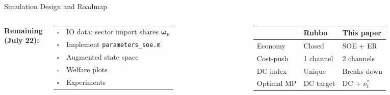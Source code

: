 \documentclass[aspectratio=169, 10pt]{beamer}
\newcommand{\bom}{\bm{\omega}_F}
\begin{document}
\begin{frame}{Simulation Design and Roadmap}
\begin{columns}[t]
\vspace{4pt}
{\footnotesize \textbf{Remaining (July 22):}

\begin{tabular}{@{}ll@{}}
$\square$ & IO data: sector import shares $\bom$ \\
$\square$ & Implement \texttt{parameters\_soe.m} \\
$\square$ & Augmented state space \\
$\square$ & Welfare plots \\
$\square$ & Experiments \\
\end{tabular}
}

\vspace{4pt}
{\scriptsize
\begin{tabular}{@{}lll@{}}
\toprule
 & \textbf{Rubbo} & \textbf{This paper} \\
\midrule
Economy & Closed & SOE + ER \\
Cost-push & 1 channel & 2 channels \\
DC index & Unique & Breaks down \\
Optimal MP & DC target & DC + $\nu_t^*$ \\
\bottomrule
\end{tabular}
}

\end{columns}

\end{frame}
\end{document}
